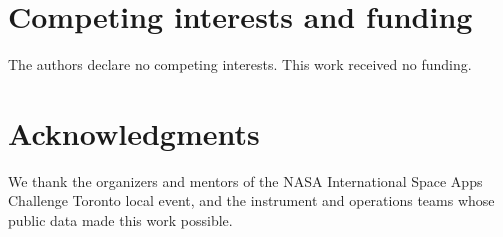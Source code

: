\documentclass[10pt,twocolumn]{article}
\begin{document}
\section*{Competing interests and funding}
The authors declare no competing interests. This work received no funding.

\section*{Acknowledgments}
We thank the organizers and mentors of the NASA International Space Apps Challenge Toronto local event, and the instrument and operations teams whose public data made this work possible.



\end{document}
